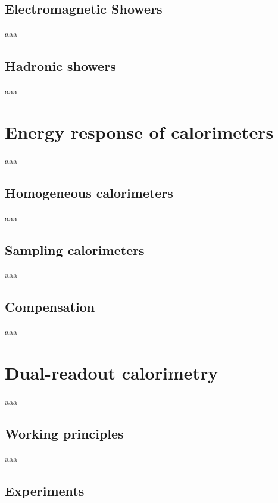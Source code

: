\subsection{Electromagnetic Showers}
aaa

\subsection{Hadronic showers}
aaa

\section{Energy response of calorimeters}
aaa

\subsection{Homogeneous calorimeters}
aaa

\subsection{Sampling calorimeters}
aaa

\subsection{Compensation}
aaa

\section{Dual-readout calorimetry}
aaa

\subsection{Working principles}
aaa

\subsection{Experiments}